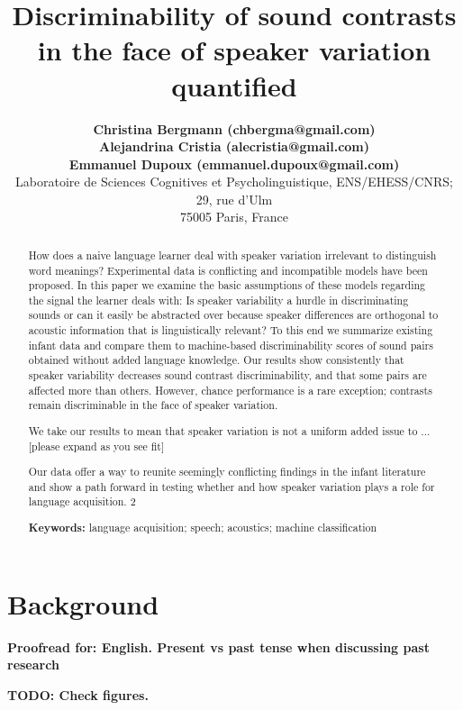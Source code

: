 \documentclass[10pt,letterpaper]{article}
\title{Discriminability of sound contrasts in the face of speaker variation quantified}
\author{{\large \bf Christina Bergmann (chbergma@gmail.com)} \\
{\large \bf Alejandrina Cristia (alecristia@gmail.com)} \\
{\large \bf Emmanuel Dupoux (emmanuel.dupoux@gmail.com)} \\
  Laboratoire de Sciences Cognitives et Psycholinguistique, ENS/EHESS/CNRS; 29, rue d'Ulm\\
75005 Paris, France \\
  }
\begin{document}
\maketitle

\begin{abstract}
How does a naive language learner deal with speaker variation irrelevant to distinguish word meanings? Experimental data is conflicting and incompatible models have been proposed. In this paper we examine the basic assumptions of these models regarding the signal the learner deals with: Is speaker variability a hurdle in discriminating sounds or can it easily be abstracted over because speaker differences are orthogonal to acoustic information that is linguistically relevant? To this end we summarize existing infant data and compare them to machine-based discriminability scores of sound pairs obtained without added language knowledge. Our results show consistently that speaker variability decreases sound contrast discriminability, and that some pairs are affected more than others. However, chance performance is a rare exception; contrasts remain discriminable in the face of speaker variation. 

We take our results to mean that speaker variation is not a uniform added issue to ... [please expand as you see fit]

Our data offer a way to reunite seemingly conflicting findings in the infant literature and show a path forward in testing whether and how speaker variation plays a role for language acquisition.


\textbf{Keywords:} language acquisition; speech; acoustics; machine classification

\end{abstract}


\section{Background}

\textbf{Proofread for: English. Present vs past tense when discussing past research}

\textbf{TODO: Check figures.}
\end{document}

